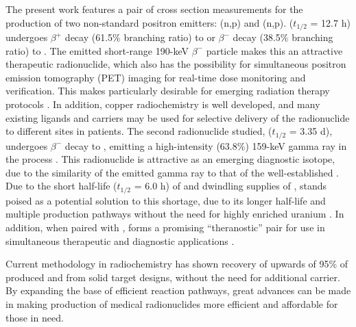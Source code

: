 \documentclass[5p]{elsarticle}
\newcommand{\comment}[1]{\todo[color=blue!20!white,inline]{ASV: #1}}
\begin{document}
The present work features a pair of cross section measurements for the production of two non-standard positron emitters: (n,p) and (n,p).
  ($t_{1/2}$ = 12.7 h) undergoes $\beta^+$ decay (61.5\% branching ratio) to  or $\beta^-$ decay (38.5\% branching ratio) to  \cite{Singh2007}.
The emitted short-range 190-keV $\beta^-$ particle makes this an  attractive  therapeutic radionuclide, which also has the possibility for simultaneous positron emission tomography (PET) imaging for real-time dose monitoring and verification.
This makes  particularly desirable  for emerging radiation therapy protocols \cite{Lewis2003,NSACIsotopesSubcommittee2015,Bandari2014,mp500671j}.
In addition, copper radiochemistry is well developed, and many existing ligands and carriers may be used for selective delivery of the radionuclide to different sites in patients.
The second radionuclide studied,  ($t_{1/2}$ = 3.35 d), undergoes $\beta^-$ decay to , emitting a high-intensity (63.8\%) 159-keV gamma ray in the process \cite{Burrows2007}.
This radionuclide is  attractive as an emerging diagnostic isotope, due to the similarity of the emitted gamma ray to that of the  well-established  \cite{Qaim2011,Qaim201731,Kolsky1998,mausner1995evaluation}.
Due to the short half-life ($t_{1/2}$ = 6.0 h) of and dwindling supplies of ,  stands poised as a potential solution to this shortage, due to its longer half-life and multiple production pathways without the need for highly enriched uranium \cite{Browne2011}.
In addition, when paired with ,  forms a promising \enquote{theranostic} pair for use in simultaneous therapeutic and diagnostic applications \cite{Muller2014,Deilami-nezhad2016}.




Current methodology in radiochemistry has shown recovery of upwards of 95\% of produced  \cite{bhatki1969preparation,mirzadeh1992spontaneous} and  \cite{Aly1971,Bokhari2010,BF02047448} from solid target designs, without the need for additional carrier.
By expanding the base of efficient reaction pathways, great advances can be made in making production of medical radionuclides more efficient and affordable for those in need.
\end{document}

